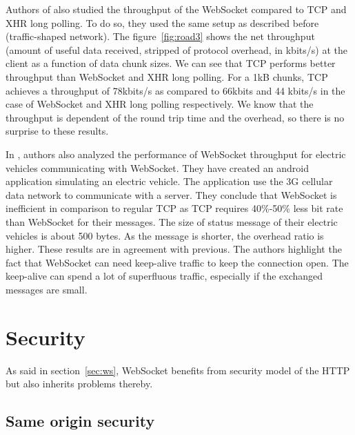 \documentclass[10pt,journal,compsoc]{IEEEtran}
\newcommand{\ws}{WebSocket}
\begin{document}
Authors of \cite{roadblock} also studied the throughput of the \ws{} compared to TCP and XHR long polling.
To do so, they used the same setup as described before (traffic-shaped network).
The figure~\ref{fig:road3} shows the net throughput (amount of useful data received, stripped of protocol overhead, in kbits/s) at the client as a function of data chunk sizes.
We can see that TCP performs better throughput than \ws{} and XHR long polling.
For a 1kB chunks, TCP achieves a throughput of 78kbits/s as compared to 66kbits and 44 kbits/s in the case of \ws{} and XHR long polling respectively.
We know that the throughput is dependent of the round trip time and the overhead, so there is no surprise to these results.

In \cite{EV}, authors also analyzed the performance of \ws{} throughput for electric vehicles communicating with \ws{}.
They have created an android application simulating an electric vehicle.
The application use the 3G cellular data network to communicate with a server.
They conclude that \ws{} is inefficient in comparison to regular TCP as TCP requires 40\%-50\% less bit rate than \ws{} for their messages.
The size of status message of their electric vehicles is about 500 bytes. 
As the message is shorter, the overhead ratio is higher.
These results are in agreement with previous.
The authors highlight the fact that \ws{} can need keep-alive traffic to keep the connection open.
The keep-alive can spend a lot of superfluous traffic, especially if the exchanged messages are small.


\section{Security}

As said in section~\ref{sec:ws}, \ws{} benefits from security model of the HTTP but also inherits problems thereby.

\subsection{Same origin security}
\end{document}
